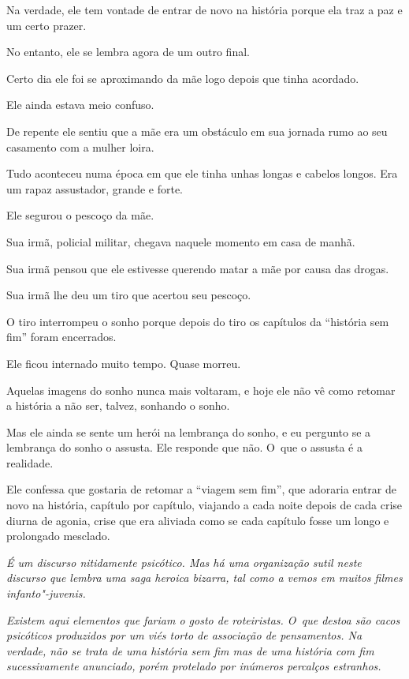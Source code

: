 Na verdade, ele tem vontade de entrar de novo na história porque ela traz
a paz e um certo prazer.

No entanto, ele se lembra agora de um outro final.

Certo dia ele foi se aproximando da mãe logo depois que tinha acordado.

Ele ainda estava meio confuso.

De repente ele sentiu que a mãe era um obstáculo em sua jornada rumo ao
seu casamento com a mulher loira.

Tudo aconteceu numa época em que ele tinha unhas longas e cabelos
longos. Era um rapaz assustador, grande e forte.

Ele segurou o pescoço da mãe.

Sua irmã, policial militar, chegava naquele momento em casa de manhã.

Sua irmã pensou que ele estivesse querendo matar a mãe por causa das
drogas.

Sua irmã lhe deu um tiro que acertou seu pescoço.

O tiro interrompeu o sonho porque depois do tiro os capítulos da
``história sem fim'' foram encerrados.

Ele ficou internado muito tempo. Quase morreu.

Aquelas imagens do sonho nunca mais voltaram, e hoje ele não vê como
retomar a história a não ser, talvez, sonhando o sonho.

Mas ele ainda se sente um herói na lembrança do sonho, e eu pergunto se
a lembrança do sonho o assusta. Ele responde que não. O~que o assusta é
a realidade.

Ele confessa que gostaria de retomar a ``viagem sem fim'', que adoraria
entrar de novo na história, capítulo por capítulo, viajando a cada noite
depois de cada crise diurna de agonia, crise que era aliviada como se
cada capítulo fosse um longo e prolongado mesclado. ~{}~

\begin{center}\asterisc{}\end{center}


\emph{É um discurso nitidamente psicótico. Mas há uma organização sutil
neste discurso que lembra uma saga heroica bizarra, tal como a vemos em
muitos filmes infanto"-juvenis.}~

\emph{Existem aqui elementos que fariam o gosto de roteiristas. O~que
destoa são cacos psicóticos produzidos por um viés torto de associação
de pensamentos. Na verdade, não se trata de uma história sem fim mas de
uma história com fim sucessivamente anunciado, porém protelado por
inúmeros percalços estranhos.}~

